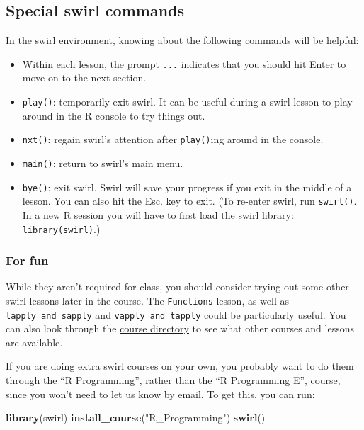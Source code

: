 \documentclass[]{book}
\makeatletter
\newenvironment{Shaded}{\begin{snugshade}}{\end{snugshade}}
\newcommand{\KeywordTok}[1]{\textcolor[rgb]{0.13,0.29,0.53}{\textbf{{#1}}}}
\newcommand{\StringTok}[1]{\textcolor[rgb]{0.31,0.60,0.02}{{#1}}}
\newcommand{\NormalTok}[1]{{#1}}
\providecommand{\tightlist}{%
  \setlength{\itemsep}{0pt}\setlength{\parskip}{0pt}}
\newenvironment{kframe}{%
\medskip{}
\setlength{\fboxsep}{.8em}
 \def\at@end@of@kframe{}%
 \ifinner\ifhmode%
  \def\at@end@of@kframe{\end{minipage}}%
  \begin{minipage}{\columnwidth}%
 \fi\fi%
 \def\FrameCommand##1{\hskip\@totalleftmargin \hskip-\fboxsep
 \colorbox{shadecolor}{##1}\hskip-\fboxsep
     \hskip-\linewidth \hskip-\@totalleftmargin \hskip\columnwidth}%
 \MakeFramed {\advance\hsize-\width
   \@totalleftmargin\z@ \linewidth\hsize
   \@setminipage}}%
 {\par\unskip\endMakeFramed%
 \at@end@of@kframe}
\renewenvironment{Shaded}{\begin{kframe}}{\end{kframe}}
\makeatother
\begin{document}
\subsection{Special swirl commands}\label{special-swirl-commands}

In the swirl environment, knowing about the following commands will be
helpful:

\begin{itemize}
\tightlist
\item
  Within each lesson, the prompt \texttt{...} indicates that you should
  hit Enter to move on to the next section.
\item
  \texttt{play()}: temporarily exit swirl. It can be useful during a
  swirl lesson to play around in the R console to try things out.
\item
  \texttt{nxt()}: regain swirl's attention after \texttt{play()}ing
  around in the console.
\item
  \texttt{main()}: return to swirl's main menu.
\item
  \texttt{bye()}: exit swirl. Swirl will save your progress if you exit
  in the middle of a lesson. You can also hit the Esc. key to exit. (To
  re-enter swirl, run \texttt{swirl()}. In a new R session you will have
  to first load the swirl library: \texttt{library(swirl)}.)
\end{itemize}

\subsubsection{For fun}\label{for-fun}

While they aren't required for class, you should consider trying out
some other swirl lessons later in the course. The \texttt{Functions}
lesson, as well as \texttt{lapply\ and\ sapply} and
\texttt{vapply\ and\ tapply} could be particularly useful. You can also
look through the \href{https://github.com/swirldev/swirl_courses}{course
directory} to see what other courses and lessons are available.

If you are doing extra swirl courses on your own, you probably want to
do them through the ``R Programming'', rather than the ``R Programming
E'', course, since you won't need to let us know by email. To get this,
you can run:

\begin{Shaded}
\begin{Highlighting}[]
\KeywordTok{library}\NormalTok{(swirl)}
\KeywordTok{install_course}\NormalTok{(}\StringTok{"R_Programming"}\NormalTok{)}
\KeywordTok{swirl}\NormalTok{()}
\end{Highlighting}
\end{Shaded}
\end{document}
